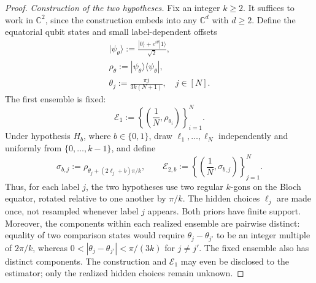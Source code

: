 \documentclass[aps,prx,reprint,superscriptaddress,amsmath,amssymb,longbibliography,floatfix]{revtex4-2}
\theoremstyle{plain}
\theoremstyle{definition}
\theoremstyle{remark}
\begin{document}
\begin{proof}
\emph{Construction of the two hypotheses.} Fix an integer $k\ge2$. It suffices to work in $\mathbb C^2$, since the construction embeds into any $\mathbb C^d$ with $d\ge2$. Define the equatorial qubit states and small label-dependent offsets
\begin{equation}
\begin{gathered}
|\psi_\theta\rangle:=\frac{|0\rangle+e^{i\theta}|1\rangle}{\sqrt2},\\ \rho_\theta:=|\psi_\theta\rangle\langle\psi_\theta|,\\ \theta_j:=\frac{\pi j}{3k(N+1)},\quad j\in[N].
\end{gathered}
\label{eq:app-mmd-lower-equatorial-states}
\end{equation}
The first ensemble is fixed:
\[
\mathcal E_1:=\left\{\left(\frac1N,\rho_{\theta_i}\right)\right\}_{i=1}^N.
\]
Under hypothesis $H_b$, where $b\in\{0,1\}$, draw $\ell_1,\ldots,\ell_N$ independently and uniformly from $\{0,\ldots,k-1\}$, and define
\begin{equation}
\sigma_{b,j}:=\rho_{\theta_j+(2\ell_j+b)\pi/k},\qquad \mathcal E_{2,b}:=\left\{\left(\frac1N,\sigma_{b,j}\right)\right\}_{j=1}^N.
\label{eq:app-mmd-lower-prior-ensembles}
\end{equation}
Thus, for each label $j$, the two hypotheses use two regular $k$-gons on the Bloch equator, rotated relative to one another by $\pi/k$. The hidden choices $\ell_j$ are made once, not resampled whenever label $j$ appears. Both priors have finite support. Moreover, the components within each realized ensemble are pairwise distinct: equality of two comparison states would require $\theta_j-\theta_{j'}$ to be an integer multiple of $2\pi/k$, whereas $0<|\theta_j-\theta_{j'}|<\pi/(3k)$ for $j\ne j'$. The fixed ensemble also has distinct components. The construction and $\mathcal E_1$ may even be disclosed to the estimator; only the realized hidden choices remain unknown.


\end{proof}
\end{document}
